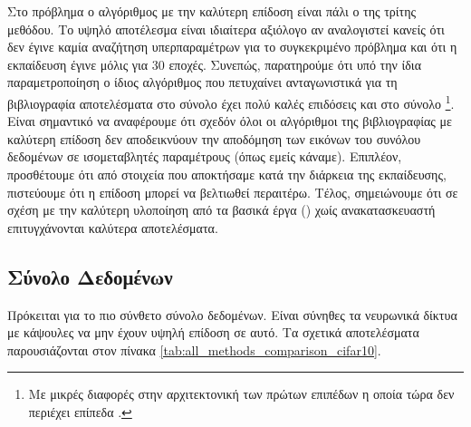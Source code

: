 Στο πρόβλημα  ο αλγόριθμος με την καλύτερη επίδοση είναι πάλι ο  της τρίτης μεθόδου. Το υψηλό αποτέλεσμα είναι ιδιαίτερα αξιόλογο αν αναλογιστεί κανείς ότι δεν έγινε καμία αναζήτηση υπερπαραμέτρων για το συγκεκριμένο πρόβλημα και ότι η εκπαίδευση έγινε μόλις για 30 εποχές. Συνεπώς, παρατηρούμε ότι υπό την ίδια παραμετροποίηση ο ίδιος αλγόριθμος που πετυχαίνει ανταγωνιστικά για τη βιβλιογραφία αποτελέσματα στο σύνολο  έχει πολύ καλές επιδόσεις και στο σύνολο \footnote{Με μικρές διαφορές στην αρχιτεκτονική των πρώτων επιπέδων η οποία τώρα δεν περιέχει επίπεδα .}. Είναι σημαντικό να αναφέρουμε ότι σχεδόν όλοι οι αλγόριθμοι της βιβλιογραφίας με καλύτερη επίδοση δεν αποδεικνύουν την αποδόμηση των εικόνων του συνόλου δεδομένων σε ισομεταβλητές παραμέτρους  (όπως εμείς κάναμε). Επιπλέον, προσθέτουμε ότι από στοιχεία που αποκτήσαμε κατά την διάρκεια της εκπαίδευσης, πιστεύουμε ότι η επίδοση μπορεί να βελτιωθεί περαιτέρω. Τέλος, σημειώνουμε ότι σε σχέση με την καλύτερη υλοποίηση από τα βασικά έργα (\cite{kosiorek2019stacked,sabour2017dynamic,hinton2018matrix}) χωίς ανακατασκευαστή επιτυγχάνονται καλύτερα αποτελέσματα.\par

\subsection{Σύνολο Δεδομένων }
Πρόκειται για το πιο σύνθετο σύνολο δεδομένων. Είναι σύνηθες τα νευρωνικά δίκτυα με κάψουλες να μην έχουν υψηλή επίδοση σε αυτό. Τα σχετικά αποτελέσματα παρουσιάζονται στον πίνακα \ref{tab:all_methods_comparison_cifar10}.


